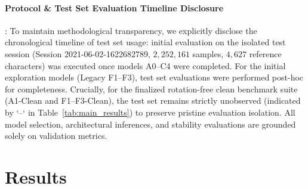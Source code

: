 \documentclass{article}
\begin{document}
\paragraph{Protocol \& Test Set Evaluation Timeline Disclosure}:
To maintain methodological transparency, we explicitly disclose the chronological timeline of test set usage: initial evaluation on the isolated test session (Session 2021-06-02-1622682789, $2{,}252{,}161$ samples, $4{,}627$ reference characters) was executed once models A0--C4 were completed. For the initial exploration models (Legacy F1--F3), test set evaluations were performed post-hoc for completeness. Crucially, for the finalized rotation-free clean benchmark suite (A1-Clean and F1--F3-Clean), the test set remains strictly unobserved (indicated by `--` in Table~\ref{tab:main_results}) to preserve pristine evaluation isolation. All model selection, architectural inferences, and stability evaluations are grounded solely on validation metrics.

\section{Results}
\label{sec:results}
\end{document}
